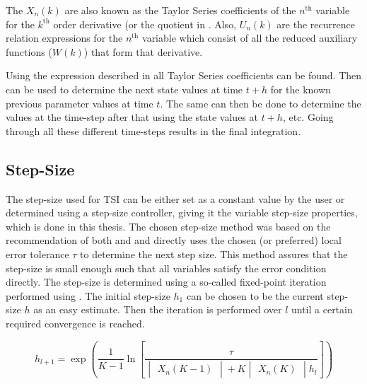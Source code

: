 
\noindent
The $X_{n}\left(k\right)$ are also known as the Taylor Series coefficients of the $n^{\text{th}}$ variable for the $k^{\text{th}}$ order derivative (or the quotient in . Also, $U_{n}\left(k\right)$ are the recurrence relation expressions for the $n^{\text{th}}$ variable which consist of all the reduced auxiliary functions ($W\left(k\right)$) that form that derivative. 

\noindent
Using the expression described in  all Taylor Series coefficients can be found. Then  can be used to determine the next state values at time $t+h$ for the known previous parameter values at time $t$. The same can then be done to determine the values at the time-step after that using the state values at $t+h$, etc. Going through all these different time-steps results in the final integration. 

\subsection{Step-Size}
\label{subsec:stepSizeTsi}
The step-size used for \ac{TSI} can be either set as a constant value by the user or determined using a step-size controller, giving it the variable step-size properties, which is done in this thesis. The chosen step-size method was based on the recommendation of both \cite{scott2008high} and \cite{bergsma2015application} and directly uses the chosen (or preferred) local error tolerance $\tau$ to determine the next step size. This method assures that the step-size is small enough such that all variables satisfy the error condition directly. The step-size is determined using a so-called fixed-point iteration performed using . The initial step-size $h_{1}$ can be chosen to be the current step-size $h$ as an easy estimate. Then the iteration is performed over $l$ until a certain required convergence is reached.



\begin{equation} \label{eq:fix_point_it}
h_{l+1}=\exp\left(\dfrac{1}{K-1}\ln\left[\dfrac{\tau}{\begin{vmatrix}
X_{n}\left(K-1\right)
\end{vmatrix}+K\begin{vmatrix}
X_{n}\left(K\right)
\end{vmatrix}h_{l}}\right]\right)
\end{equation}

